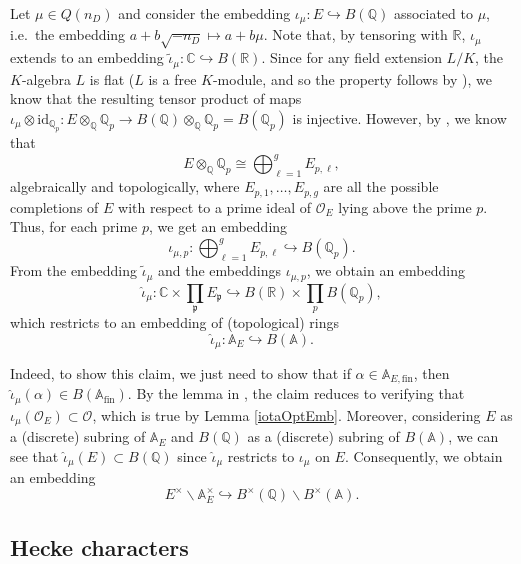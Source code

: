 \documentclass[11pt]{amsart}
\newcommand{\bigo}{\mathcal{O}}
\newcommand{\R}{\mathbb{R}}
\newcommand{\Q}{\mathbb{Q}}
\newcommand{\C}{\mathbb{C}}
\newcommand{\A}{\mathbb{A}}
\theoremstyle{definition}
\theoremstyle{remark}
\begin{document}
Let $\mu \in Q(n_D)$ and consider the embedding $\iota_{\mu}: E \hookrightarrow B(\Q)$ associated to $\mu$, i.e.~the embedding $a+b\sqrt{-n_D} \mapsto a+b\mu$. Note that, by tensoring with $\R$, $\iota_{\mu}$ extends to an embedding $\widetilde{\iota}_{\mu} : \C \hookrightarrow B(\R)$. Since for any field extension $L/K$, the $K$-algebra $L$ is flat ($L$ is a free $K$-module, and so the property follows by \cite[\S 10.5, Cor. 42]{DummitFoote}), we know that the resulting tensor product of maps $\iota_{\mu} \otimes \mathrm{id}_{\Q_p} : E\otimes_{\Q} \Q_p \rightarrow B(\Q) \otimes_{\Q} \Q_p = B(\Q_p)$ is injective. However, by \cite[\S I.10, pg. 57]{CasselsFrohlich}, we know that 
\begin{equation}
    E\otimes_{\Q} \Q_p \cong \bigoplus_{\ell=1}^{g} E_{p,\ell}, \label{NumberFieldTensorpAdic}
\end{equation}
algebraically and topologically, where $E_{p,1}, \dots, E_{p,g}$ are all the possible completions of $E$ with respect to a prime ideal of $\bigo_E$ lying above the prime $p$. Thus, for each prime $p$, we get an embedding $$ \iota_{\mu,p} : \bigoplus_{\ell=1}^{g} E_{p,\ell} \hookrightarrow B(\Q_p).$$ From the embedding $\widetilde{\iota}_{\mu}$ and the embeddings $\iota_{\mu,p}$, we obtain an embedding $$\widehat{\iota}_{\mu} : \C \times \prod_{\mathfrak{p}} E_{\mathfrak{p}} \hookrightarrow B(\R) \times \prod_{p} B(\Q_p),$$ which restricts to an embedding of (topological) rings 
\begin{equation*}
    \widehat{\iota}_{\mu} : \A_{E} \hookrightarrow B(\A).
\end{equation*} 

Indeed, to show this claim, we just need to show that if $\alpha \in \A_{E,\text{fin}}$, then $\widehat{\iota}_{\mu}(\alpha) \in B(\A_{\text{fin}})$. By the lemma in \cite[\S I.12, pg. 61]{CasselsFrohlich}, the claim reduces to verifying that $\iota_{\mu}(\bigo_E) \subset \bigo$, which is true by Lemma \ref{iotaOptEmb}. 
Moreover, considering $E$ as a (discrete) subring of $\A_{E}$ and $B(\Q)$ as a (discrete) subring of $B(\A)$, we can see that $\widehat{\iota}_{\mu}(E) \subset B(\Q)$ since $\widehat{\iota}_{\mu}$ restricts to $\iota_{\mu}$ on $E$. Consequently, we obtain an embedding
\begin{equation*}
    E^{\times} \backslash \A_{E}^{\times} \hookrightarrow B^{\times}(\Q) \backslash B^{\times}(\A).
\end{equation*} 




\subsection{Hecke characters}
\end{document}
